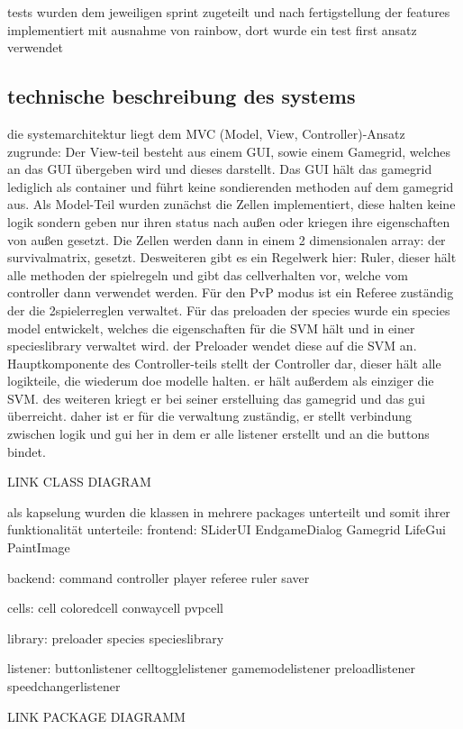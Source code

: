 \documentclass[12pt]{article}
\theoremstyle{plain}
\begin{document}
\begin{linenumbers}
tests wurden dem jeweiligen sprint zugeteilt und nach fertigstellung der features implementiert
mit ausnahme von rainbow, dort wurde ein test first ansatz verwendet

\subsection{technische beschreibung des systems}

die systemarchitektur liegt dem MVC (Model, View, Controller)-Ansatz zugrunde:
Der View-teil besteht aus einem GUI, sowie einem Gamegrid, welches an das GUI übergeben wird und dieses darstellt.
Das GUI hält das gamegrid lediglich als container und führt keine sondierenden methoden auf dem gamegrid aus.
Als Model-Teil wurden zunächst die Zellen implementiert, diese halten keine logik sondern geben nur ihren status nach außen oder kriegen ihre eigenschaften
von außen gesetzt. Die Zellen werden dann in einem 2 dimensionalen array: der survivalmatrix, gesetzt. Desweiteren gibt es ein Regelwerk hier: Ruler,
dieser hält alle methoden der spielregeln und gibt das cellverhalten vor, welche vom controller dann verwendet werden. Für den PvP modus ist ein Referee zuständig der die 2spielerreglen
verwaltet. Für das preloaden der species wurde ein species model entwickelt, welches die eigenschaften für die SVM hält und in einer specieslibrary verwaltet wird. der Preloader wendet diese auf die SVM an.
Hauptkomponente des Controller-teils stellt der Controller dar, dieser hält alle logikteile, die wiederum doe modelle halten. er hält außerdem als einziger die SVM.
des weiteren kriegt er bei seiner erstelluing das gamegrid und das gui überreicht. daher ist er für die verwaltung zuständig, er stellt verbindung zwischen logik und gui her in dem
er alle listener erstellt und an die buttons bindet.


LINK CLASS DIAGRAM

als kapselung wurden die klassen in mehrere packages unterteilt und somit ihrer funktionalität unterteile:
frontend:
SLiderUI
EndgameDialog
Gamegrid
LifeGui
PaintImage

backend:
command
controller
player
referee
ruler
saver

cells:
cell
coloredcell
conwaycell
pvpcell

library:
preloader
species
specieslibrary

listener:
buttonlistener
celltogglelistener
gamemodelistener
preloadlistener
speedchangerlistener


LINK PACKAGE DIAGRAMM


\end{linenumbers}
\end{document}
